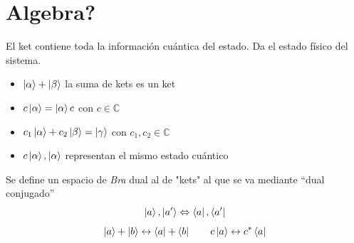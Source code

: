 \documentclass[10pt,oneside]{CBFT_book}
\begin{document}
\section{Algebra?}

El ket contiene toda la información cuántica del estado. Da el estado físico del sistema.
\begin{itemize}
 \item $\Ket{\alpha} + \Ket{\beta}$ la suma de kets es un ket
 \item $c\Ket{\alpha}= \Ket{\alpha} c$ con $c\in\mathbb{C}$
 \item  $c_1\Ket{\alpha} + c_2\Ket{\beta} = \Ket{\gamma}$ con $c_1,c_2 \in \mathbb{C}$
 \item $c\Ket{\alpha},\Ket{\alpha}$ representan el mismo estado cuántico
\end{itemize}

Se define un espacio de {\it Bra} dual al de "kets" al que se va mediante ``dual conjugado''
\[
	\Ket{a}, \Ket{a'} \Leftrightarrow \Bra{a}, \Bra{a'}
\]
\[
	\Ket{a} + \Ket{b} \leftrightarrow \Bra{a} + \Bra{b} \qquad 
	c\Ket{a} \leftrightarrow c^*\Bra{a}
\]
\end{document}
